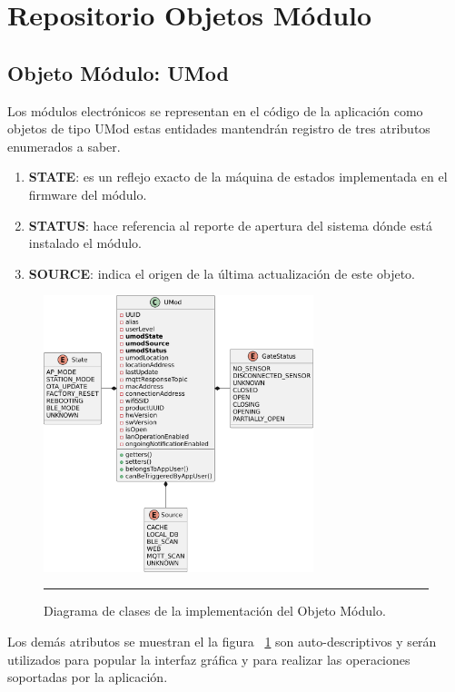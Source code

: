 \section{Repositorio Objetos Módulo}
\subsection{Objeto Módulo: UMod}
Los módulos electrónicos se representan en el código de la aplicación como objetos de tipo UMod 
estas entidades mantendrán registro de tres atributos enumerados a saber.
\begin{enumerate}
	\item \textbf{STATE}: es un reflejo exacto de la máquina de estados implementada en el firmware del módulo.
	\item \textbf{STATUS}: hace referencia al reporte de apertura del sistema dónde está instalado el módulo.
	\item \textbf{SOURCE}: indica el origen de la última actualización de este objeto.
\end{enumerate}

\begin{figure}[htbp]
	\centering
	\includegraphics[width=0.7\textwidth]{Figures/iter1/CLASS_umod_ink.png}
	\rule{35em}{1pt}
	\caption[Clases del Objeto Módulo]{Diagrama de clases de la implementación del Objeto Módulo.}
	\label{fig:class_umod}
\end{figure}

Los demás atributos se muestran el la figura ~\ref{fig:class_umod} son auto-descriptivos y serán utilizados para popular la interfaz gráfica y para realizar las operaciones soportadas por la aplicación.

